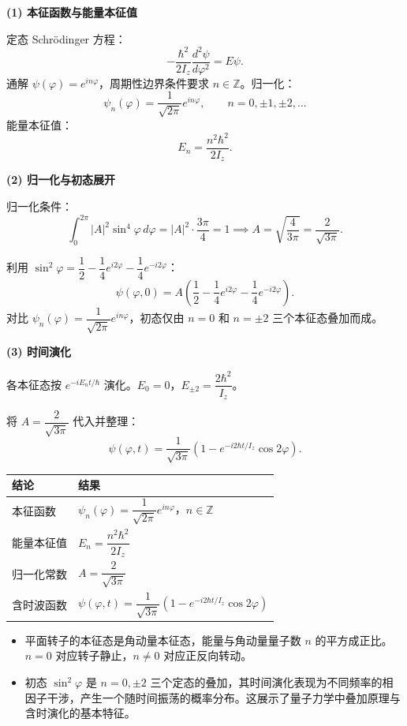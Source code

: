 \begin{derivationbox}[标准解题过程]
\textbf{(1) 本征函数与能量本征值}

定态 Schrödinger 方程：
\[
-\frac{\hbar^2}{2I_z}\frac{d^2\psi}{d\varphi^2}=E\psi.
\]
通解 $\psi(\varphi)=e^{in\varphi}$，周期性边界条件要求 $n\in\mathbb{Z}$。归一化：
\[
\psi_n(\varphi)=\frac{1}{\sqrt{2\pi}}e^{in\varphi},\qquad n=0,\pm1,\pm2,\ldots
\]
能量本征值：
\begin{equation}
\boxed{E_n=\frac{n^2\hbar^2}{2I_z}.}
\end{equation}

\textbf{(2) 归一化与初态展开}

归一化条件：
\[
\int_0^{2\pi}|A|^2\sin^4\varphi\,d\varphi=|A|^2\cdot\frac{3\pi}{4}=1\implies A=\sqrt{\frac{4}{3\pi}}=\frac{2}{\sqrt{3\pi}}.
\]

利用 $\sin^2\varphi=\dfrac{1}{2}-\dfrac{1}{4}e^{i2\varphi}-\dfrac{1}{4}e^{-i2\varphi}$：
\[
\psi(\varphi,0)=A\left(\frac{1}{2}-\frac{1}{4}e^{i2\varphi}-\frac{1}{4}e^{-i2\varphi}\right).
\]
对比 $\psi_n(\varphi)=\dfrac{1}{\sqrt{2\pi}}e^{in\varphi}$，初态仅由 $n=0$ 和 $n=\pm2$ 三个本征态叠加而成。

\textbf{(3) 时间演化}

各本征态按 $e^{-iE_nt/\hbar}$ 演化。$E_0=0$，$E_{\pm2}=\dfrac{2\hbar^2}{I_z}$。

将 $A=\dfrac{2}{\sqrt{3\pi}}$ 代入并整理：
\begin{equation}
\boxed{\psi(\varphi,t)=\frac{1}{\sqrt{3\pi}}\left(1-e^{-i2\hbar t/I_z}\cos2\varphi\right).}
\end{equation}
\end{derivationbox}

\begin{formulabox}[答案汇总]
\begin{center}
\begin{tabular}{ll}
\toprule
\textbf{结论} & \textbf{结果} \\
\midrule
本征函数 & $\psi_n(\varphi)=\dfrac{1}{\sqrt{2\pi}}e^{in\varphi}$，$n\in\mathbb{Z}$ \\
能量本征值 & $E_n=\dfrac{n^2\hbar^2}{2I_z}$ \\
归一化常数 & $A=\dfrac{2}{\sqrt{3\pi}}$ \\
含时波函数 & $\psi(\varphi,t)=\dfrac{1}{\sqrt{3\pi}}\left(1-e^{-i2\hbar t/I_z}\cos2\varphi\right)$ \\
\bottomrule
\end{tabular}
\end{center}
\end{formulabox}

\begin{insightbox}[物理图像]
\begin{itemize}
    \item 平面转子的本征态是角动量本征态，能量与角动量量子数 $n$ 的平方成正比。$n=0$ 对应转子静止，$n\neq0$ 对应正反向转动。
    \item 初态 $\sin^2\varphi$ 是 $n=0,\pm2$ 三个定态的叠加，其时间演化表现为不同频率的相因子干涉，产生一个随时间振荡的概率分布。这展示了量子力学中叠加原理与含时演化的基本特征。
\end{itemize}
\end{insightbox}
